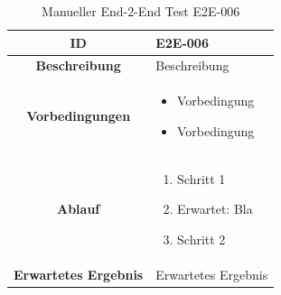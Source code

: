 \documentclass[a4paper,12pt]{report}
\begin{document}
    \begin{table}[h!]
        \centering
        \setlength{\leftmargini}{0.4cm}
        \begin{tabular}{|c|p{10cm}|}
            \hline
            \textbf{ID}           & E2E-006              \\ \hline
            \textbf{Beschreibung} & Beschreibung         \\ \hline
            \textbf{Vorbedingungen} &
            \begin{itemize}
                \item Vorbedingung
                \item Vorbedingung
            \end{itemize} \\ \hline
            \textbf{Ablauf} &
            \begin{enumerate}
                \item Schritt 1
                \item Erwartet: Bla
                \item Schritt 2
            \end{enumerate} \\ \hline
            \textbf{Erwartetes Ergebnis} & Erwartetes Ergebnis \\ \hline
        \end{tabular}
        \caption{Manueller End-2-End Test E2E-006}\label{tab:e2e-6}
    \end{table}
\end{document}
